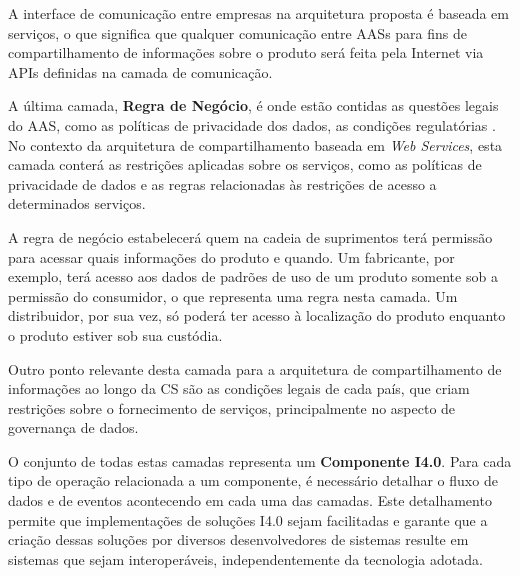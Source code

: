 	A interface de comunicação entre empresas na arquitetura proposta é baseada em serviços, o que significa que qualquer comunicação entre AASs para fins de compartilhamento de informações sobre o produto será feita pela Internet via APIs definidas na camada de comunicação.
		
	A última camada, \textbf{Regra de Negócio}, é onde estão contidas as questões legais do AAS, como as políticas de privacidade dos dados, as condições regulatórias \cite{adolphs2015rami}. No contexto da arquitetura de compartilhamento baseada em \textit{Web Services}, esta camada conterá as restrições aplicadas sobre os serviços, como as políticas de privacidade de dados e as regras relacionadas às restrições de acesso a determinados serviços.
	
	A regra de negócio estabelecerá quem na cadeia de suprimentos terá permissão para acessar quais informações do produto e quando. Um fabricante, por exemplo, terá acesso aos dados de padrões de uso de um produto somente sob a permissão do consumidor, o que representa uma regra nesta camada. Um distribuidor, por sua vez, só poderá ter acesso à localização do produto enquanto o produto estiver sob sua custódia.
	
	Outro ponto relevante desta camada para a arquitetura de compartilhamento de informações ao longo da CS são as condições legais de cada país, que criam restrições sobre o fornecimento de serviços, principalmente no aspecto de governança de dados.
	
	
	O conjunto de todas estas camadas representa um \textbf{Componente I4.0}. Para cada tipo de operação relacionada a um componente, é necessário detalhar o fluxo de dados e de eventos acontecendo em cada uma das camadas. Este detalhamento permite que implementações de soluções I4.0 sejam facilitadas e garante que a criação dessas soluções por diversos desenvolvedores de sistemas resulte em sistemas que sejam interoperáveis, independentemente da tecnologia adotada.
	
